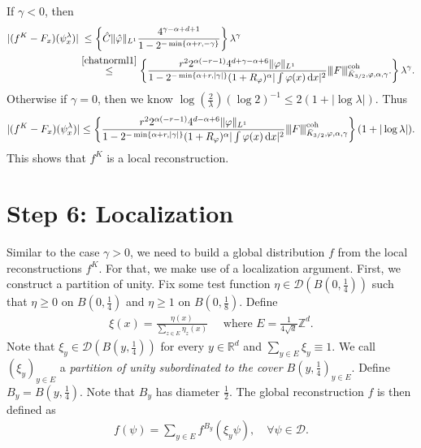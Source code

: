 If $\gamma < 0$, then 
\begin{align}
    |(f^K - F_x)(\psi_x^\lambda)| &\;\leq \left\{  \hat C\lVert \hat \varphi \rVert_{L^1}  \frac{4^{\gamma - \alpha + d + 1}}{1 - 2^{-\min\left\{ \alpha + r, - \gamma \right\}}} \right\} \lambda^\gamma \nonumber \\
    &\overset{\eqref{chatnorml1}}{\leq} \left\{ 
        \frac{r^2 2^{\alpha(-r-1)} 4^{d+ \gamma -\alpha + 6} \lVert \varphi \rVert_{L^1}}{1-2^{- \min \left\{ \alpha + r, |\gamma| \right\}} (1+R_{\varphi})^\alpha |\int \varphi(x) \, \mathrm{d}x|^2 }
        {\left\vert\kern-0.25ex\left\vert\kern-0.25ex\left\vert F \right\vert\kern-0.25ex\right\vert\kern-0.25ex\right\vert}^{\mathrm{coh}}_{\bar K_{3/2}, \varphi, \alpha, \gamma}.
     \right\}
     \lambda^\gamma. \label{MacbookAirGammaNegative}
\end{align} 
Otherwise if $\gamma = 0$, then we know $\log(\frac{2}{\lambda}) (\log{2})^{-1} \leq 2(1 + |\log \lambda|)$. Thus
\begin{align*}
    |(f^K - F_x)(\psi_x^\lambda)| \leq \left\{ 
        \frac{r^2 2^{\alpha(-r-1)} 4^{d -\alpha + 6} \lVert \varphi \rVert_{L^1}}{1-2^{- \min \left\{ \alpha + r, |\gamma| \right\}} (1+R_{\varphi})^\alpha |\int \varphi(x) \, \mathrm{d}x|^2 }
        {\left\vert\kern-0.25ex\left\vert\kern-0.25ex\left\vert F \right\vert\kern-0.25ex\right\vert\kern-0.25ex\right\vert}^{\mathrm{coh}}_{\bar K_{3/2}, \varphi, \alpha, \gamma}
     \right\}
     (1 + |\log \lambda|).
\end{align*} 
This shows that $f^K$ is a local reconstruction. 






\section{Step 6: \texorpdfstring{Localization}{Localization}}\label{chapter:step6gammaNegative}


Similar to the case $\gamma > 0$, we need to build a global distribution $f$ from the local reconstructions $f^K$. For that, we make use of a localization argument. First, we construct a partition of unity. Fix some test function $\eta \in \mathcal{D}(B(0, \frac{1}{4}))$ such that $\eta \geq 0$ on $B(0, \frac{1}{4})$ and $\eta \geq 1$ on $B(0, \frac{1}{8})$. Define 
\begin{align*}
    \xi(x) = \frac{\eta(x)}{\sum\limits_{z \in E} \eta_z(x)} \quad \text{ where } E = \frac{1}{4\sqrt{d}} \mathbb{Z}^d.
\end{align*}
Note that $\xi_y \in \mathcal{D}(B(y, \frac{1}{4}))$ for every $y \in \mathbb{R}^d$ and $\sum\limits_{y \in E} \xi_y \equiv 1$. We call $(\xi_y)_{y \in E}$ a \emph{partition of unity subordinated to the cover $B(y, \frac{1}{4})_{y \in E}$}. Define $B_y = B(y, \frac{1}{4})$. Note that $B_y$ has diameter $\frac{1}{2}$. The global reconstruction $f$ is then defined as
\begin{align*}
    f(\psi) = \sum_{y \in E} f^{B_y}(\xi_y \psi), \quad \forall \psi \in \mathcal{D}.
\end{align*}

